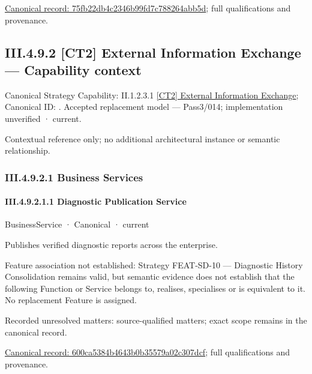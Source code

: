 {\footnotesize \href{../../../../../../../../continuum/business/business-function/75fb22db4c2346b99fd7c788264abb5d.md}{Canonical record: 75fb22db4c2346b99fd7c788264abb5d}; full qualifications and provenance.}\par
\subsection*{III.4.9.2 [CT2] External Information Exchange — Capability context}
\label{navigation:III.4.9.2}

{\small Canonical Strategy Capability: II.1.2.3.1 \hyperref[element:883265005129434382aa86d2bcadb989]{[CT2] External Information Exchange}; Canonical ID: \texttt{}. Accepted replacement model — Pass3/014; implementation unverified · current.}\par
Contextual reference only; no additional architectural instance or semantic relationship.\par
\subsubsection*{III.4.9.2.1 Business Services}
\label{navigation:III.4.9.2.1}

\paragraph*{III.4.9.2.1.1 Diagnostic Publication Service}
\label{navigation:III.4.9.2.1.1}

\label{element:600ca5384b4643b0b35579a02c307dcf}
{\small BusinessService · Canonical · current}\par

Publishes verified diagnostic reports across the enterprise.



Feature association not established: Strategy FEAT-SD-10 — Diagnostic History Consolidation remains valid, but semantic evidence does not establish that the following Function or Service belongs to, realises, specialises or is equivalent to it. No replacement Feature is assigned.


{\small Recorded unresolved matters: source-qualified matters; exact scope remains in the canonical record.}\par
{\footnotesize \href{../../../../../../../../continuum/business/business-service/600ca5384b4643b0b35579a02c307dcf.md}{Canonical record: 600ca5384b4643b0b35579a02c307dcf}; full qualifications and provenance.}\par
